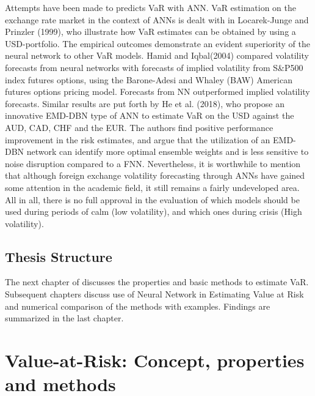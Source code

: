 \documentclass[a4paper,11pt,oneside]{book}
\begin{document}
Attempts have been made to predicts VaR with ANN. VaR estimation on the exchange rate market in the context of ANNs is dealt with in
Locarek-Junge and Prinzler (1999), who illustrate how VaR estimates can be obtained
by using a USD-portfolio. The empirical outcomes demonstrate an evident superiority
of the neural network to other VaR models. Hamid and Iqbal(2004) compared volatility forecasts from neural networks with forecasts of implied volatility from S\&P500 index futures options, using the Barone-Adesi and Whaley (BAW) American futures options pricing model. Forecasts from NN outperformed implied volatility forecasts. Similar results are put forth by He et al.
(2018), who propose an innovative EMD-DBN type of ANN to estimate VaR on the
USD against the AUD, CAD, CHF and the EUR. The authors find positive
performance improvement in the risk estimates, and argue that the utilization of an
EMD-DBN network can identify more optimal ensemble weights and is less sensitive
to noise disruption compared to a FNN. Nevertheless, it is worthwhile to mention that although
foreign exchange volatility forecasting through ANNs have gained some attention in
the academic field, it still remains a fairly undeveloped area.
\newline\newline
All in all, there is no full approval in the evaluation of which models should be used during
periods of calm (low volatility), and which ones during crisis (High volatility).


\section{Thesis Structure}
The next chapter of discusses the properties and basic methods to estimate VaR. Subsequent chapters discuss use of Neural Network in Estimating Value at Risk and numerical comparison of the methods with examples. Findings are summarized in the last chapter.




\chapter{Value-at-Risk: Concept,  properties and methods}
\end{document}
